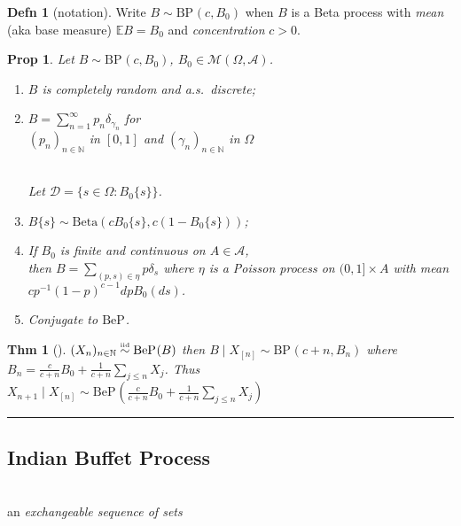 \documentclass[reqno,oneside,twocolumn,10pt]{amsart}
\newtheorem*{thm}{{\color{BrickRed}Thm}}
\newtheorem*{prop}{{\color{BrickRed}Prop}}
\theoremstyle{definition}
\newtheorem*{definition}{{\color{OliveGreen}Defn}}
\theoremstyle{remark}
\newcommand{\nprocess}[3]{(#1_{#3})_{#3 \in #2}}
\newcommand{\bspace}{\Omega}
\newcommand{\bsa}{\mathcal A}
\newcommand{\borelspace}{(\bspace,\bsa)}
\newcommand{\Measures}{\mathcal M}
\newcommand{\dist}{\sim}
\newcommand{\Nats}{\mathbb{N}}
\newcommand{\distiid}{\overset{\textrm{\tiny iid}}{\dist}}\newcommand{\given}{\mid}
\newcommand{\process}[2]{\nprocess #1 #2 n}
\newcommand{\thelaw}{}%
\newcommand{\Beta}{\mathrm{Beta}}
\newcommand{\BPLAW}{\mathrm{BP}_{\thelaw}}
\newcommand{\BePLAW}{\mathrm{BeP_{\thelaw}}}
\newcommand{\EE}{\mathbb{E}}
\begin{document}
\vspace{1em}
\begin{definition}[notation]
Write $B \dist \BPLAW(c,B_0)$ when $B$ is a 
Beta process with 
\emph{mean} (aka base measure) $\EE B = B_0$ 
and \emph{concentration} $c>0$.
\end{definition}

\begin{prop}%
Let $B \dist \BPLAW(c,B_0)$, $B_0 \in \Measures \borelspace$.
\begin{enumerate}

\item $B$ is completely random and a.s.\ discrete; 
\item $B = \sum_{n=1}^\infty p_n \delta_{\gamma_n}$ for \hfill \\
\hfill $\process p \Nats$ in $[0,1]$ and $\process \gamma \Nats$ in $\bspace$
\vspace{-0.5em}

\ \\
Let $\mathcal D = \{ s \in \bspace : B_0\{s\} \}$.
\vspace{.5em}


\item 
$B\{s\} \dist \Beta(c B_0\{s\},c(1-B_0\{s\}))$;

\item
If $B_0$ is finite and continuous on $A \in \bsa$, \\
then $B = \sum_{(p,s) \in \eta} p \delta_s$ where $\eta$ is a Poisson process on $(0,1] \times A$ with mean \\ $c p^{-1} (1-p)^{c-1} dp B_0(ds)$.

\item 
Conjugate to $\BePLAW$.

\end{enumerate}
\end{prop}

\begin{thm}[{\citep{Hjort90,Kim99}}]
$\process X \Nats \distiid \BePLAW(B)$ then
$B \given X_{[n]} \dist \BPLAW(c+n,B_n)$
where \\
$B_n = \frac c {c+n} B_0 + \frac 1 {c+n} \sum_{j\le n} X_j$.
Thus\\
$X_{n+1} \given X_{[n]} \dist \BePLAW(\frac c {c+n} B_0 + \frac 1 {c+n} \sum_{j\le n} X_j)$
\end{thm}

\hrule
\subsection{Indian Buffet Process}\hfill\\
an \emph{exchangeable sequence of sets}\vspace{-.3em}
\end{document}
